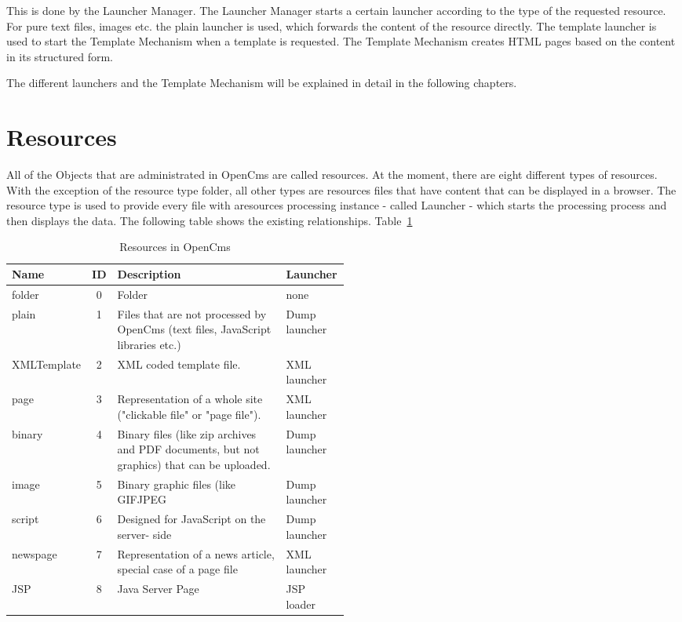 This is done by the {\name Launcher Manager}. The {\name Launcher Manager} starts a
certain launcher according to the type of the requested resource. For
pure text files, images etc. the plain launcher is used, which forwards
the content of the resource directly. The {\name template launcher} is used to
start the Template Mechanism when a template is requested. The {\name Template
Mechanism} creates HTML pages based on the content in its structured form.

The different launchers and the {\name Template Mechanism} will be explained in
detail in the following chapters.
\newpage

\section{Resources}
All of the Objects that are administrated in OpenCms are called
{\name resources}. At the moment, there are eight different types of
resources. With the exception of the resource type {\name folder,} all other
types are resources files that have content that can be displayed in a
browser. The  resource type is used to provide every file with aresources
processing instance - called {\name Launcher} - which starts the processing
process and then displays the data. The following table shows the
existing relationships. {Table~\ref {resources}}
\begin{table}[h]
\begin{center}
\begin{tabular}{|l|c|p{0.50\linewidth}|l|}
\hline
{\bf Name}& 
{\bf ID}& 
{\bf Description}& 
{\bf Launcher}\\ \hline
folder&
0& Folder&none\\ \hline
plain&
1&
Files that are not processed by OpenCms (text files, JavaScript libraries etc.)&
Dump launcher\\ \hline
XMLTemplate&
2&
XML coded template file.&
XML launcher\\ \hline
page&
3&
Representation of a whole site ("clickable file" or "page file").&
XML launcher\\ \hline
binary&
4& 
Binary files (like zip archives and PDF documents, but not graphics) that can be uploaded.&
Dump launcher\\ \hline
image& 
5& 
Binary graphic files (like  GIFJPEG& 
Dump launcher\\ \hline
script& 
6& 
Designed for JavaScript on the server- side& 
Dump launcher\\ \hline
newspage&
7& 
Representation of a news article, special case of a page file& 
XML launcher\\ \hline 
JSP&
8& 
Java Server Page& 
JSP loader\\ \hline 
\end{tabular}
\caption [Resources in OpenCms]{Resources in OpenCms}
\end{center}
\label{resources}
\end{table}

